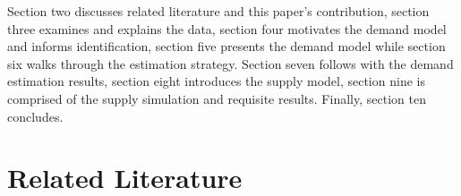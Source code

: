 \documentclass[11pt]{article}
\theoremstyle{definition}
\theoremstyle{remark}
\begin{document}
Section two discusses related literature and this paper's contribution, section three examines and explains the data, section four motivates the demand model and informs identification, section five presents the demand model while section six walks through the estimation strategy. Section seven follows with the demand estimation results, section eight introduces the supply model, section nine is comprised of the supply simulation and requisite results. Finally, section ten concludes.
\section{Related Literature}

\end{document}
